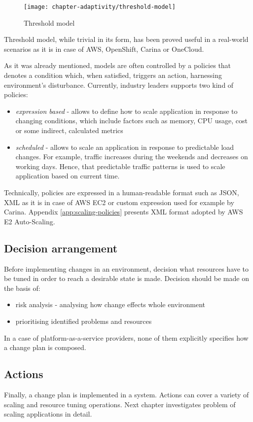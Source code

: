 \begin{figure}[!ht]
  \begin{center}
    \texttt{[image: chapter-adaptivity/threshold-model]}
  \end{center}
  \caption{Threshold model}
  \label{fig:threshold-model}
\end{figure}

Threshold model, while trivial in its form, has been proved useful in a real-world scenarios as it is in case of AWS, OpenShift, Carina or OneCloud.

As it was already mentioned, models are often controlled by a policies that denotes a condition which, when satisfied, triggers an action, harnessing environment's disturbance. Currently, industry leaders supports \cite{AmazonAutoScaling} two kind of policies:
\begin{itemize}
 \item \textit{expression based} - allows to define how to scale application in response to changing conditions, which include factors such as memory, CPU usage, cost or some indirect, calculated metrics
 \item \textit{scheduled} - allows to scale an application in response to predictable load changes. For example, traffic increases during the weekends and decreases on working days. Hence, that predictable traffic patterns is used to scale application based on current time.
\end{itemize}

Technically, policies are expressed in a human-readable format such as JSON, XML as it is in case of AWS EC2 or custom expression used for example by Carina. Appendix \ref{app:scaling-policies} presents XML format adopted by AWS E2 Auto-Scaling.

\subsection{Decision arrangement}
Before implementing changes in an environment, decision what resources have to be tuned in order to reach a desirable state is made. Decision should be made on the basis of:
\begin{itemize}
 \item risk analysis - analysing how change effects whole environment
 \item prioritising identified problems and resources
\end{itemize}

In a case of platform-as-a-service providers, none of them explicitly specifies how a change plan is composed.

\subsection{Actions}
Finally, a change plan is implemented in a system. Actions can cover a variety of scaling and resource tuning operations. Next chapter investigates problem of scaling applications in detail.
